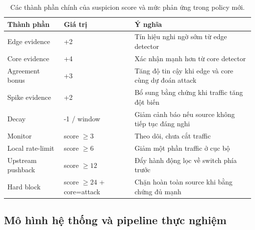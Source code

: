 \begin{table}
\caption{Các thành phần chính của suspicion score và mức phản ứng trong policy mới.}
\label{tab:score-policy}
\centering
\begin{tabular}{p{3.0cm}p{2.2cm}p{4.6cm}}
\toprule
\textbf{Thành phần} & \textbf{Giá trị} & \textbf{Ý nghĩa} \\
\midrule
Edge evidence & +2 & Tín hiệu nghi ngờ sớm từ edge detector \\
Core evidence & +4 & Xác nhận mạnh hơn từ core detector \\
Agreement bonus & +3 & Tăng độ tin cậy khi edge và core cùng dự đoán attack \\
Spike evidence & +2 & Bổ sung bằng chứng khi traffic tăng đột biến \\
Decay & -1 / window & Giảm cảnh báo nếu source không tiếp tục đáng nghi \\
Monitor & score $\geq 3$ & Theo dõi, chưa cắt traffic \\
Local rate-limit & score $\geq 6$ & Giảm một phần traffic ở cục bộ \\
Upstream pushback & score $\geq 12$ & Đẩy hành động lọc về switch phía trước \\
Hard block & score $\geq 24$ + core=attack & Chặn hoàn toàn source khi bằng chứng đủ mạnh \\
\bottomrule
\end{tabular}
\end{table}

\subsection{Mô hình hệ thống và pipeline thực nghiệm}

